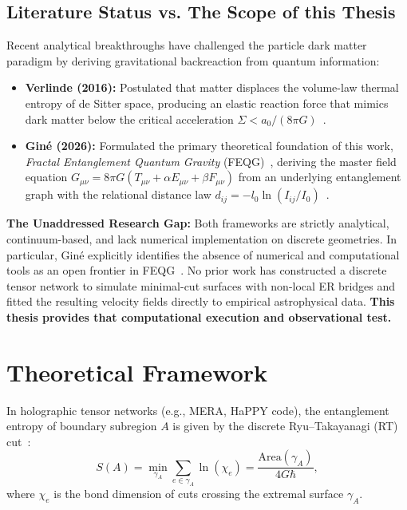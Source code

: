 \documentclass[10pt,a4paper]{article}
\begin{document}
\subsection{Literature Status vs. The Scope of this Thesis}
Recent analytical breakthroughs have challenged the particle dark matter paradigm by deriving gravitational backreaction from quantum information:
\begin{itemize}\setlength{\itemsep}{1pt}
    \item \textbf{Verlinde (2016):} Postulated that matter displaces the volume-law thermal entropy of de Sitter space, producing an elastic reaction force that mimics dark matter below the critical acceleration $\Sigma < a_0 / (8\pi G)$~\cite{verlinde2016}.
    \item \textbf{Gin\'e (2026):} Formulated the primary theoretical foundation of this work, \emph{Fractal Entanglement Quantum Gravity} (FEQG)~\cite{gine2026}, deriving the master field equation $G_{\mu\nu} = 8\pi G(T_{\mu\nu} + \alpha E_{\mu\nu} + \beta F_{\mu\nu})$ from an underlying entanglement graph with the relational distance law $d_{ij} = -l_0 \ln(I_{ij}/I_0)$~\cite{gine2026}.
\end{itemize}
\textbf{The Unaddressed Research Gap:} Both frameworks are strictly analytical, continuum-based, and lack numerical implementation on discrete geometries. In particular, Gin\'e explicitly identifies the absence of numerical and computational tools as an open frontier in FEQG~\cite{gine2026}. No prior work has constructed a discrete tensor network to simulate minimal-cut surfaces with non-local ER bridges and fitted the resulting velocity fields directly to empirical astrophysical data. \textbf{This thesis provides that computational execution and observational test.}

\section{Theoretical Framework}
\label{sec:theory}

In holographic tensor networks (e.g., MERA, HaPPY code), the entanglement entropy of boundary subregion $A$ is given by the discrete Ryu--Takayanagi (RT) cut~\cite{ryu2006}:
\begin{equation}
S(A) = \min_{\gamma_A} \sum_{e \in \gamma_A} \ln(\chi_e) = \frac{\mathrm{Area}(\gamma_A)}{4G\hbar},
\label{eq:RT}
\end{equation}
where $\chi_e$ is the bond dimension of cuts crossing the extremal surface $\gamma_A$.
\end{document}

